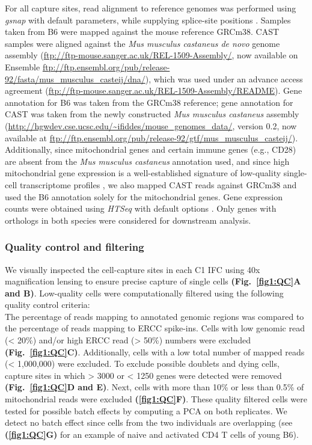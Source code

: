 For all capture sites, read alignment to reference genomes was performed using \emph{gsnap} with default parameters, while supplying splice-site positions \citep{Wu2010a}. Samples taken from B6 were mapped against the mouse reference GRCm38. CAST samples were aligned against the \emph{Mus musculus castaneus de novo} genome assembly (\url{ftp://ftp-mouse.sanger.ac.uk/REL-1509-Assembly/}, now available on Ensemble \url{ftp://ftp.ensembl.org/pub/release-92/fasta/mus_musculus_casteij/dna/}), which was used under an advance access agreement (\url{ftp://ftp-mouse.sanger.ac.uk/REL-1509-Assembly/README}). Gene annotation for B6 was taken from the GRCm38 reference; gene annotation for CAST was taken from the newly constructed \emph{Mus musculus castaneus} assembly (\url{http://hgwdev.cse.ucsc.edu/~ifiddes/mouse_genomes_data/}, version 0.2, now available at \url{ftp://ftp.ensembl.org/pub/release-92/gtf/mus_musculus_casteij/}). Additionally, since mitochondrial genes and certain immune genes (e.g., CD28) are absent from the \emph{Mus musculus castaneus} annotation used, and since high mitochondrial gene expression is a well-established signature of low-quality single-cell transcriptome profiles \citep{Ilicic2016}, we also mapped CAST reads against GRCm38 and used the B6 annotation solely for the mitochondrial genes. Gene expression counts were obtained using \emph{HTSeq} with default options \citep{Anders2014}. Only genes with orthologs in both species were considered for downstream analysis. 

\subsubsection{Quality control and filtering}

We visually inspected the cell-capture sites in each C1 IFC using 40x magnification lensing to ensure precise capture of single cells \textbf{(Fig.~\ref{fig1:QC}A and B)}. Low-quality cells were computationally filtered using the following quality control criteria:\\
The percentage of reads mapping to annotated genomic regions was compared to the percentage of reads mapping to ERCC spike-ins. Cells with low genomic read (< 20\%) and/or high ERCC read (> 50\%) numbers were excluded \textbf{(Fig.~\ref{fig1:QC}C)}. Additionally, cells with  a low total number of mapped reads (< 1,000,000) were excluded. To exclude possible doublets and dying cells, capture sites in which > 3000 or < 1250 genes were detected were removed \textbf{(Fig.~\ref{fig1:QC}D and E)}. Next, cells with more than 10\% or less than 0.5\% of mitochondrial reads were excluded \textbf{(\ref{fig1:QC}F)}. These quality filtered cells were tested for possible batch effects by computing a PCA on both replicates. We detect no batch effect since cells from the two individuals are overlapping (see \textbf{(\ref{fig1:QC}G)} for an example of naive and activated CD4\plus{} T cells of young B6).\\

